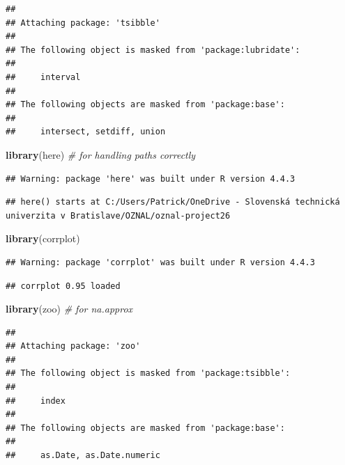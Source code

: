 \documentclass[
]{article}
\newenvironment{Shaded}{\begin{snugshade}}{\end{snugshade}}
\newcommand{\CommentTok}[1]{\textcolor[rgb]{0.56,0.35,0.01}{\textit{#1}}}
\newcommand{\FunctionTok}[1]{\textcolor[rgb]{0.13,0.29,0.53}{\textbf{#1}}}
\newcommand{\NormalTok}[1]{#1}
\begin{document}
\begin{verbatim}
## 
## Attaching package: 'tsibble'
## 
## The following object is masked from 'package:lubridate':
## 
##     interval
## 
## The following objects are masked from 'package:base':
## 
##     intersect, setdiff, union
\end{verbatim}

\begin{Shaded}
\begin{Highlighting}[]
\FunctionTok{library}\NormalTok{(here) }\CommentTok{\# for handling paths correctly}
\end{Highlighting}
\end{Shaded}

\begin{verbatim}
## Warning: package 'here' was built under R version 4.4.3
\end{verbatim}

\begin{verbatim}
## here() starts at C:/Users/Patrick/OneDrive - Slovenská technická univerzita v Bratislave/OZNAL/oznal-project26
\end{verbatim}

\begin{Shaded}
\begin{Highlighting}[]
\FunctionTok{library}\NormalTok{(corrplot)}
\end{Highlighting}
\end{Shaded}

\begin{verbatim}
## Warning: package 'corrplot' was built under R version 4.4.3
\end{verbatim}

\begin{verbatim}
## corrplot 0.95 loaded
\end{verbatim}

\begin{Shaded}
\begin{Highlighting}[]
\FunctionTok{library}\NormalTok{(zoo) }\CommentTok{\# for na.approx}
\end{Highlighting}
\end{Shaded}

\begin{verbatim}
## 
## Attaching package: 'zoo'
## 
## The following object is masked from 'package:tsibble':
## 
##     index
## 
## The following objects are masked from 'package:base':
## 
##     as.Date, as.Date.numeric
\end{verbatim}
\end{document}
